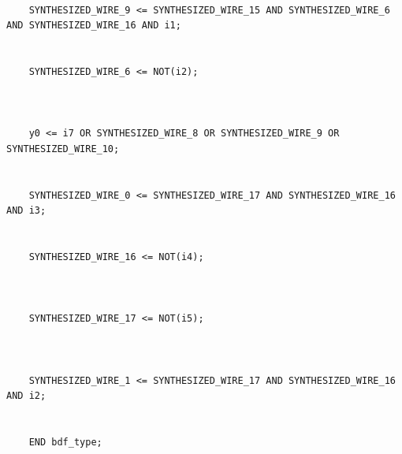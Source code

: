 \documentclass[12pt]{article}
\begin{document}
\begin{verbatim}
    
    SYNTHESIZED_WIRE_9 <= SYNTHESIZED_WIRE_15 AND SYNTHESIZED_WIRE_6 AND SYNTHESIZED_WIRE_16 AND i1;
    
    
    SYNTHESIZED_WIRE_6 <= NOT(i2);
    
    
    
    y0 <= i7 OR SYNTHESIZED_WIRE_8 OR SYNTHESIZED_WIRE_9 OR SYNTHESIZED_WIRE_10;
    
    
    SYNTHESIZED_WIRE_0 <= SYNTHESIZED_WIRE_17 AND SYNTHESIZED_WIRE_16 AND i3;
    
    
    SYNTHESIZED_WIRE_16 <= NOT(i4);
    
    
    
    SYNTHESIZED_WIRE_17 <= NOT(i5);
    
    
    
    SYNTHESIZED_WIRE_1 <= SYNTHESIZED_WIRE_17 AND SYNTHESIZED_WIRE_16 AND i2;
    
    
    END bdf_type;

\end{verbatim}
\end{document}

